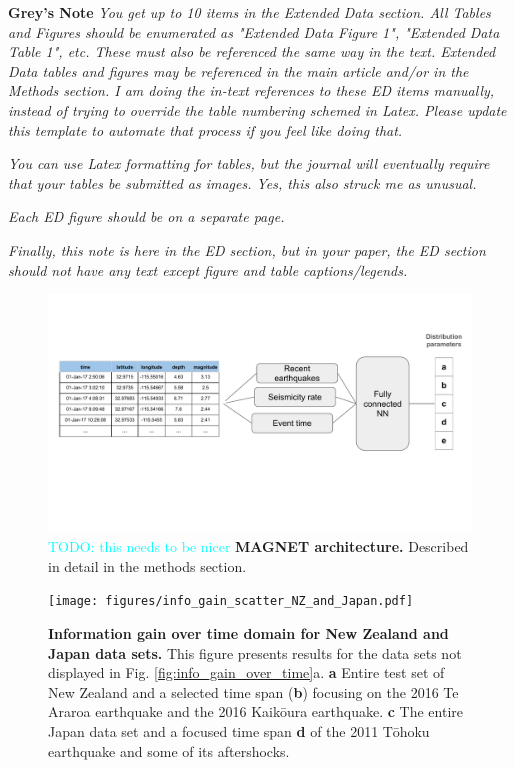 \documentclass[pdflatex]{sn-jnl}
\newcommand{\neri}[1]{{\textcolor{cyan}{#1}}}
\begin{document}
\textbf{Grey's Note} \textit{You get up to 10 items in the Extended Data section. All Tables and Figures should be enumerated as "Extended Data Figure 1", "Extended Data Table 1", etc. These must also be referenced the same way in the text. Extended Data tables and figures may be referenced in the main article and/or in the Methods section. I am doing the in-text references to these ED items manually, instead of trying to override the table numbering schemed in Latex. Please update this template to automate that process if you feel like doing that.}

\textit{You can use Latex formatting for tables, but the journal will eventually require that your tables be submitted as images. Yes, this also struck me as unusual.}

\textit{Each ED figure should be on a separate page.}

\textit{Finally, this note is here in the ED section, but in your paper, the ED section should not have any text except figure and table captions/legends.}

\newpage
\begin{figure}[h!]
    \centering
    \includegraphics[width=1\textwidth]{figures/detailed_architecture.pdf}
    \caption{\neri{TODO: this needs to be nicer} \textbf{MAGNET architecture.} Described in detail in the methods section.}
    \label{fig:architecture}
\end{figure}

\newpage
\begin{figure}[h!]
	\centering
        \texttt{[image: figures/info\_gain\_scatter\_NZ\_and\_Japan.pdf]}
	\caption{
            \textbf{Information gain over time domain for New Zealand and Japan data sets.} This figure presents results for the data sets not displayed in Fig. \ref{fig:info_gain_over_time}a. \textbf{a} Entire test set of New Zealand and a selected time span (\textbf{b}) focusing on the 2016 Te Araroa earthquake and the 2016 Kaikōura earthquake. \textbf{c} The entire Japan data set and a focused time span \textbf{d} of the 2011 Tōhoku earthquake and some of its aftershocks.
         }
\label{fig:nz_japan_info_gain}
\end{figure}
\end{document}
